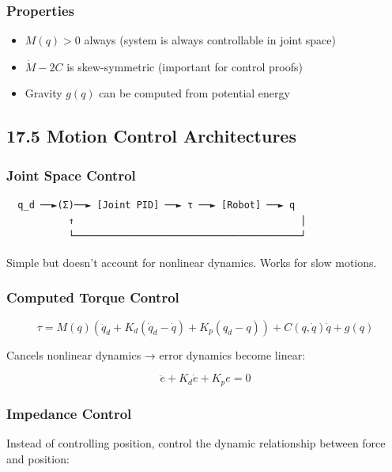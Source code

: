 \documentclass[11pt,a4paper]{book}
\begin{document}
\begin{itemize}
\subsubsection{Properties}

\begin{itemize}
\item $M(q) > 0$ always (system is always controllable in joint space)
\item $\dot{M} - 2C$ is skew-symmetric (important for control proofs)
\item Gravity $g(q)$ can be computed from potential energy
\end{itemize}

\medskip\noindent\hrulefill\medskip

\subsection{17.5 Motion Control Architectures}

\subsubsection{Joint Space Control}

\begin{lstlisting}
  q_d ──►(Σ)──► [Joint PID] ──► τ ──► [Robot] ──► q
           ↑                                        │
           └────────────────────────────────────────┘
\end{lstlisting}

Simple but doesn't account for nonlinear dynamics. Works for slow motions.

\subsubsection{Computed Torque Control}

\[\tau = M(q)\left(\ddot{q}_d + K_d(\dot{q}_d - \dot{q}) + K_p(q_d - q)\right) + C(q, \dot{q})\dot{q} + g(q)\]

Cancels nonlinear dynamics → error dynamics become linear:

\[\ddot{e} + K_d \dot{e} + K_p e = 0\]

\subsubsection{Impedance Control}

Instead of controlling position, control the dynamic relationship between force and position:


\end{itemize}
\end{document}
